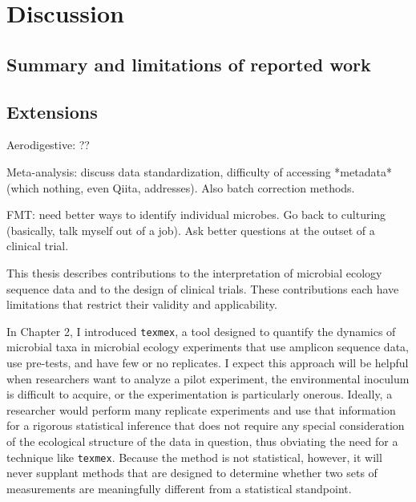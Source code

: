 \chapter{Discussion}

\section{Summary and limitations of reported work}

\section{Extensions}

Aerodigestive: ??

Meta-analysis: discuss data standardization, difficulty of accessing *metadata* (which nothing, even Qiita, addresses). Also batch correction methods.

FMT: need better ways to identify individual microbes. Go back to culturing (basically, talk myself out of a job). Ask better questions at the outset of a clinical trial.

This thesis describes contributions to the interpretation of microbial
ecology sequence data and to the design of clinical trials. These contributions
each have limitations that restrict their validity and applicability.

In Chapter 2, I introduced \texttt{texmex}, a tool designed to quantify the dynamics of
microbial taxa in microbial ecology experiments that use amplicon sequence
data, use pre-tests, and have few or no replicates. I expect this approach
will be helpful when researchers want to analyze a pilot experiment, the
environmental inoculum is difficult to acquire, or the experimentation is
particularly onerous. Ideally, a researcher would perform many replicate
experiments and use that information for a rigorous statistical inference that
does not require any special consideration of the ecological structure of the
data in question, thus obviating the need for a technique like \texttt{texmex}.
Because the method is not statistical, however, it will never supplant
methods that are designed to determine whether two sets of measurements are
meaningfully different from a statistical standpoint.

